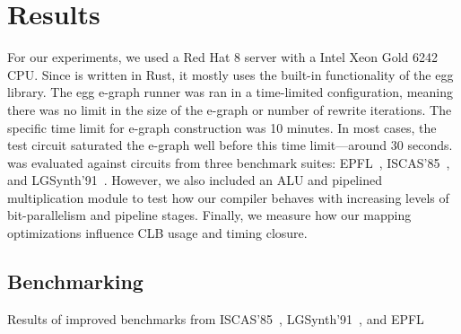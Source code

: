 \section{Results}\label{sec:results}
For our experiments, we used a Red Hat 8 server with a Intel Xeon Gold 6242
CPU. Since \shortname{} is written in Rust, it mostly uses the built-in
functionality of the egg library. The egg e-graph runner was ran in a
time-limited configuration, meaning there was no limit in the size of the
e-graph or number of rewrite iterations. The specific time limit for e-graph
construction was 10 minutes. In most cases, the test circuit saturated the
e-graph well before this time limit---around 30 seconds. \shortname{} was
evaluated against circuits from three benchmark suites: EPFL~\cite{epflbench},
ISCAS'85~\cite{iscasbench}, and LGSynth'91~\cite{lgsynthbench}. However, we
also included an ALU and pipelined multiplication module to test how our
compiler behaves with increasing levels of bit-parallelism and pipeline stages.
Finally, we measure how our mapping optimizations influence CLB usage and
timing closure.

\subsection{Benchmarking}\label{sec:results:benchmark}
\begin{table}
    \centering
    \caption{Results of \nimproved{} improved benchmarks from ISCAS'85~\cite{iscasbench}, LGSynth'91~\cite{lgsynthbench}, and EPFL~\cite{epflbench}}\label{tab:results}
\end{table}

